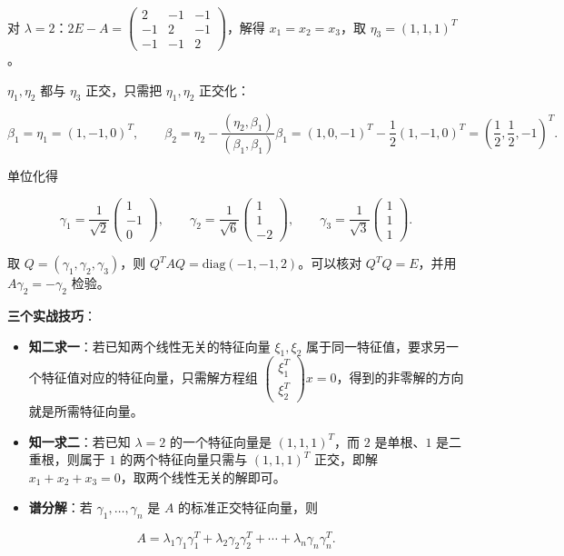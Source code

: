 \documentclass[11pt,openany,UTF8]{ctexbook}
\begin{document}
对 $\lambda=2$：$2E-A=\begin{pmatrix}2&-1&-1\\-1&2&-1\\-1&-1&2\end{pmatrix}$，解得 $x_1=x_2=x_3$，取 $\eta_3=(1,1,1)^T$。

$\eta_1,\eta_2$ 都与 $\eta_3$ 正交，只需把 $\eta_1,\eta_2$ 正交化：

\[\beta_1=\eta_1=(1,-1,0)^T,\qquad \beta_2=\eta_2-\frac{(\eta_2,\beta_1)}{(\beta_1,\beta_1)}\beta_1=(1,0,-1)^T-\frac12(1,-1,0)^T=\left(\frac12,\frac12,-1\right)^T .\]

单位化得

\[\gamma_1=\frac{1}{\sqrt2}\begin{pmatrix}1\\-1\\0\end{pmatrix},\qquad \gamma_2=\frac{1}{\sqrt6}\begin{pmatrix}1\\1\\-2\end{pmatrix},\qquad \gamma_3=\frac{1}{\sqrt3}\begin{pmatrix}1\\1\\1\end{pmatrix}.\]

取 $Q=(\gamma_1,\gamma_2,\gamma_3)$，则 $Q^TAQ=\mathrm{diag}(-1,-1,2)$。可以核对 $Q^TQ=E$，并用 $A\gamma_2=-\gamma_2$ 检验。

\textbf{三个实战技巧}：

\begin{itemize}
\item \textbf{知二求一}：若已知两个线性无关的特征向量 $\xi_1,\xi_2$ 属于同一特征值，要求另一个特征值对应的特征向量，只需解方程组 $\begin{pmatrix}\xi_1^T\\ \xi_2^T\end{pmatrix}x=0$，得到的非零解的方向就是所需特征向量。
\item \textbf{知一求二}：若已知 $\lambda=2$ 的一个特征向量是 $(1,1,1)^T$，而 $2$ 是单根、$1$ 是二重根，则属于 $1$ 的两个特征向量只需与 $(1,1,1)^T$ 正交，即解 $x_1+x_2+x_3=0$，取两个线性无关的解即可。
\item \textbf{谱分解}：若 $\gamma_1,\dots,\gamma_n$ 是 $A$ 的标准正交特征向量，则
\end{itemize}
\[A=\lambda_1\gamma_1\gamma_1^T+\lambda_2\gamma_2\gamma_2^T+\cdots+\lambda_n\gamma_n\gamma_n^T .\]
\end{document}
